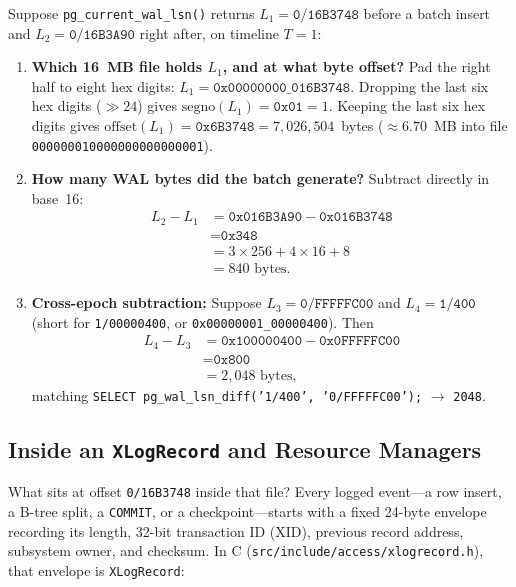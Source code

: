 \begin{example}
\label{ch04:ex-lsn-math}
Suppose \texttt{pg\_current\_wal\_lsn()} returns $L_1 = \texttt{0/16B3748}$ before a batch insert and $L_2 = \texttt{0/16B3A90}$ right after, on timeline $T = 1$:
\begin{enumerate}
  \item \textbf{Which 16~MB file holds $L_1$, and at what byte offset?}
    Pad the right half to eight hex digits: $L_1 = \texttt{0x00000000\_016B3748}$. Dropping the last six hex digits ($\gg 24$) gives $\mathrm{segno}(L_1) = \texttt{0x01} = 1$. Keeping the last six hex digits gives $\mathrm{offset}(L_1) = \texttt{0x6B3748} = 7{,}026{,}504$~bytes ($\approx 6.70$~MB into file \texttt{000000010000000000000001}).
  \item \textbf{How many WAL bytes did the batch generate?}
    Subtract directly in base~16:
    \begin{align*}
      L_2 - L_1 &= \texttt{0x016B3A90} - \texttt{0x016B3748} \\
                &= \texttt{0x348} \\
                &= 3 \times 256 + 4 \times 16 + 8 \\
                &= 840\text{ bytes}.
    \end{align*}
  \item \textbf{Cross-epoch subtraction:} Suppose $L_3 = \texttt{0/FFFFFC00}$ and $L_4 = \texttt{1/400}$ (short for \texttt{1/00000400}, or \texttt{0x00000001\_00000400}). Then
    \begin{align*}
      L_4 - L_3 &= \texttt{0x100000400} - \texttt{0x0FFFFFC00} \\
                &= \texttt{0x800} \\
                &= 2{,}048\text{ bytes},
    \end{align*}
    matching \texttt{SELECT pg\_wal\_lsn\_diff('1/400', '0/FFFFFC00');} $\to$ \texttt{2048}.
\end{enumerate}
\end{example}

\subsection{Inside an \texttt{XLogRecord} and Resource Managers}

What sits at offset \texttt{0/16B3748} inside that file? Every logged event---a row insert, a B-tree split, a \texttt{COMMIT}, or a checkpoint---starts with a fixed 24-byte envelope recording its length, 32-bit transaction ID (XID), previous record address, subsystem owner, and checksum. In C (\texttt{src/include/access/xlogrecord.h}), that envelope is \texttt{XLogRecord}:

